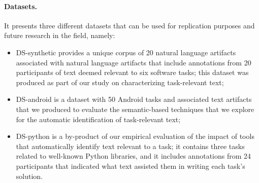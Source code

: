 
\paragraph{\textbf{Datasets.}} 

It presents three different datasets that can be used for replication purposes and future research in the field, namely:
    
\begin{itemize}
    \item \acs{DS-synthetic} provides a unique corpus of 20 natural language artifacts associated
    with natural language artifacts that include annotations from 20 participants of text deemed relevant to six software tasks; this dataset was produced as part of our study on characterizing task-relevant text;
    
    \item \acs{DS-android} is a dataset with 50 Android tasks and associated text artifacts 
    that we produced to evaluate the semantic-based techniques that we explore for the automatic identification of  task-relevant text;

    \item \acs{DS-python} is a by-product of our empirical evaluation of the impact of tools that automatically identify text relevant to a task;
    it contains three tasks related to well-known Python libraries, and it includes annotations from 24 participants that indicated what text assisted them in writing each task's solution.
\end{itemize}